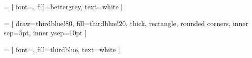  =     [  font=\sffamily\large, 
                    fill=bettergrey,
                    text=white
                    ]

 = [       draw={thirdblue!80},
                    fill={thirdblue!20},
                    thick,
                    rectangle, 
                    rounded corners, 
                    inner sep=5pt, 
                    inner ysep=10pt
                    ]
                    
 = [  font=\sffamily\large,
                    fill={thirdblue},
                    text=white
                    ]
\newcommand{\numbertable}[1]{
                        \begin{figure}[h!]
                        \begin{tikzpicture}
                        \node [table] (box){%
                            \begin{minipage}{\textwidth}
                            \centering
                            \vspace{5pt}
                            

                        #1
                            \end{minipage}
                        };
                        \node[tabletitle, right=30pt] at (box.north west) {Number Crunching};
                        \node[recipe-logo, right=5pt] at (box.north west) {\calc}; 
                        \end{tikzpicture}
                        \end{figure}
    
}                    
\newcommand{\margininbox}[3]{
                        \begin{marginfigure}
                        \begin{tikzpicture}
                        \node [name-dest] (box){%
                            \begin{minipage}{0.95\textwidth}
                            \vspace{8pt}
                            \normalsize{#2}
                            \end{minipage}
                        };
                        \node[fancytitle, right=30pt] at (box.north west) {#1};
                        \node[logbook-logo, right = 5pt] at(box.north west) {\protect#3};
                        \end{tikzpicture}
                        \end{marginfigure}
}



